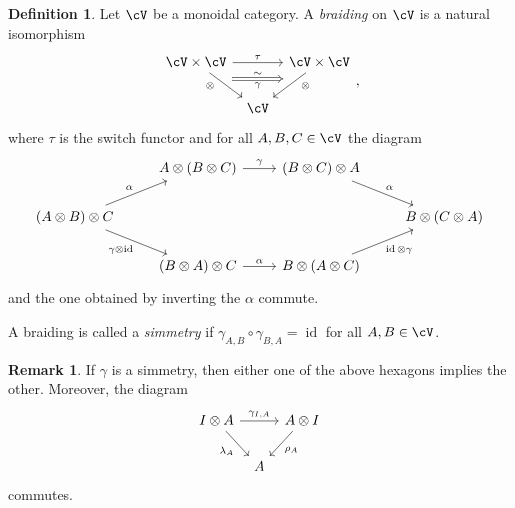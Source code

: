 \documentclass[a4paper,11pt,oneside,openany]{scrbook}
\DeclareMathOperator{\id}{id}
\theoremstyle{definition}
\theoremstyle{definition}
\newtheorem{defn}[thm]{Definition} %
\newtheorem{rmk}[thm]{Remark}
\begin{document}
\begin{defn}
    Let $\cV$ be a monoidal category. A \emph{braiding} on $\cV$ is a natural isomorphism
    \[
    \begin{tikzcd}[column sep=tiny]
        \cV\times\cV\ar[rr, "\tau"]\ar[dr, swap, near start, "\otimes", ""{name=A, anchor=center}]
        && \cV\times\cV\ar[dl, near start, "\otimes", ""{name=B, anchor=center}] \\
        & \cV
        \ar[Rightarrow, shorten <= .8em, shorten >= .8em, "\gamma"', "\sim", from=A, to=B]
    \end{tikzcd}
    ,\]
    where $\tau$ is the switch functor and for all $A,B,C\in\cV$ the diagram
    \[
    \begin{tikzcd}
    & A\otimes(B\otimes C)\ar[r, "\gamma"]
    & (B\otimes C)\otimes A\ar[dr, "\alpha"] \\
    (A\otimes B)\otimes C\ar[dr, swap, "\gamma\otimes\id"]\ar[ur, "\alpha"]
    &&& B\otimes(C\otimes A) \\
    & (B\otimes A)\otimes C\ar[r, "\alpha"]
    & B\otimes(A\otimes C)\ar[ur, swap, "\id\otimes\gamma"]
    \end{tikzcd}
    \]
    and the one obtained by inverting the $\alpha$ commute.
    
    A braiding is called a \emph{simmetry} if $\gamma_{A,B}\circ\gamma_{B,A}=\id$ for all $A,B\in\cV$.
\end{defn}

\begin{rmk}
    If $\gamma$ is a simmetry, then either one of the above hexagons implies the other. Moreover, the diagram
    \[
    \begin{tikzcd}[column sep=tiny]
    I\otimes A\ar[rr, "\gamma_{I,A}"]\ar[dr, swap, "\lambda_A"]
    && A\otimes I\ar[dl, "\rho_A"] \\
    & A
    \end{tikzcd}
    \]
    commutes.
\end{rmk}
\end{document}
